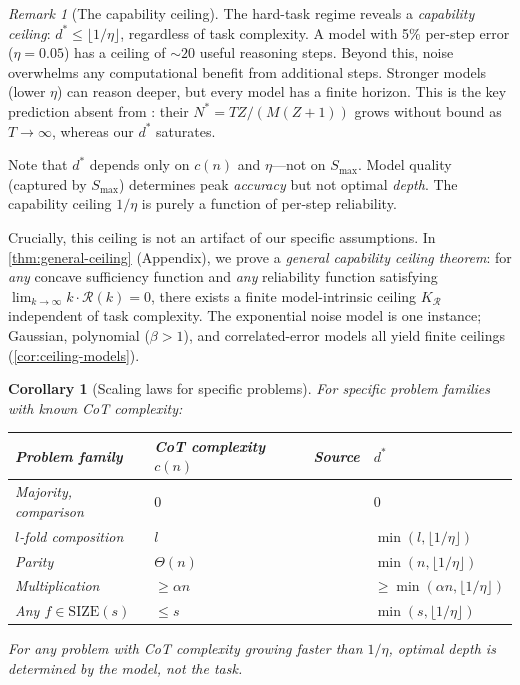 \documentclass{article}
\newtheorem{corollary}[theorem]{Corollary}
\theoremstyle{definition}
\theoremstyle{remark}
\newtheorem{remark}[theorem]{Remark}
\newcommand{\depth}{d^*}       %
\newcommand{\noise}{\eta}      %
\newcommand{\rel}{\mathcal{R}} %
\newcommand{\ccot}{c}          %
\newcommand{\Smax}{S_{\max}}   %
\newcommand{\SIZE}{\mathrm{SIZE}}
\begin{document}
\begin{remark}[The capability ceiling]
\label{rem:ceiling}
The hard-task regime reveals a \emph{capability ceiling}: $\depth \leq \lfloor 1/\noise \rfloor$, regardless of task complexity. A model with 5\% per-step error ($\noise = 0.05$) has a ceiling of $\sim\!20$ useful reasoning steps. Beyond this, noise overwhelms any computational benefit from additional steps. Stronger models (lower $\noise$) can reason deeper, but every model has a finite horizon. This is the key prediction absent from \citet{wu2025when}: their $N^* = TZ/(M(Z+1))$ grows without bound as $T \to \infty$, whereas our $\depth$ saturates.

Note that $\depth$ depends only on $\ccot(n)$ and $\noise$---not on $\Smax$. Model quality (captured by $\Smax$) determines peak \emph{accuracy} but not optimal \emph{depth}. The capability ceiling $1/\noise$ is purely a function of per-step reliability.

Crucially, this ceiling is not an artifact of our specific assumptions. In \cref{thm:general-ceiling} (Appendix), we prove a \emph{general capability ceiling theorem}: for \emph{any} concave sufficiency function and \emph{any} reliability function satisfying $\lim_{k \to \infty} k \cdot \rel(k) = 0$, there exists a finite model-intrinsic ceiling $K_\rel$ independent of task complexity. The exponential noise model is one instance; Gaussian, polynomial ($\beta > 1$), and correlated-error models all yield finite ceilings (\cref{cor:ceiling-models}).
\end{remark}

\begin{corollary}[Scaling laws for specific problems]
\label{cor:scaling-laws}
For specific problem families with known CoT complexity:
\begin{center}
\begin{tabular}{llll}
\toprule
\textbf{Problem family} & \textbf{CoT complexity $\ccot(n)$} & \textbf{Source} & \textbf{$\depth$} \\
\midrule
Majority, comparison & $0$ & \cite{merrill2022saturated} & $0$ \\
$l$-fold composition & $l$ & \cite{barcelo2025ehrenfeucht} & $\min(l, \lfloor 1/\noise \rfloor)$ \\
Parity & $\Theta(n)$ & \cite{amiri2025lower} & $\min(n, \lfloor 1/\noise \rfloor)$ \\
Multiplication & $\geq \alpha n$ & \cite{amiri2025lower} & $\geq \min(\alpha n, \lfloor 1/\noise \rfloor)$ \\
Any $f \in \SIZE(s)$ & $\leq s$ & \cite{li2024chain} & $\min(s, \lfloor 1/\noise \rfloor)$ \\
\bottomrule
\end{tabular}
\end{center}
For any problem with CoT complexity growing faster than $1/\noise$, optimal depth is determined by the model, not the task.
\end{corollary}
\end{document}
